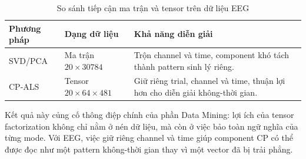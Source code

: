 \begin{table}[H]
\centering
\caption{So sánh tiếp cận ma trận và tensor trên dữ liệu EEG}
\label{tab:exp-dm-eeg-cp-svd}
\renewcommand{\arraystretch}{1.2}
\begin{tabular}{L{0.22\textwidth}C{0.32\textwidth}L{0.34\textwidth}}
\toprule
\textbf{Phương pháp} & \textbf{Dạng dữ liệu} & \textbf{Khả năng diễn giải} \\
\midrule
SVD/PCA & Ma trận $20 \times 30784$ & Trộn channel và time, component khó tách thành pattern sinh lý riêng. \\
CP-ALS & Tensor $20 \times 64 \times 481$ & Giữ riêng trial, channel và time, thuận lợi hơn cho diễn giải không-thời gian. \\
\bottomrule
\end{tabular}
\end{table}

Kết quả này củng cố thông điệp chính của phần Data Mining: lợi ích của tensor
factorization không chỉ nằm ở nén dữ liệu, mà còn ở việc bảo toàn ngữ nghĩa của
từng mode. Với EEG, việc giữ riêng channel và time giúp component CP có thể được
đọc như một pattern không-thời gian thay vì một vector đã bị trải phẳng.
